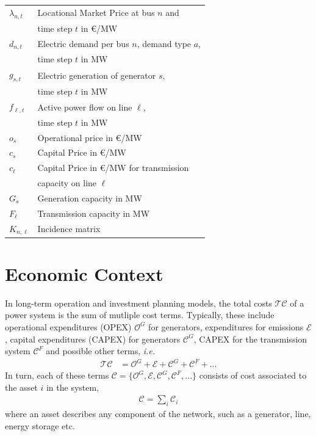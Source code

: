 \documentclass[11pt,twocolumn]{article}
\newcommand{\ie}{\textit{i.e.} }
\newcommand{\vpad}{\vspace{1mm}}
\newcommand{\generation}{g_{s,t}}
\newcommand{\capacitygeneration}{G_{s}}
\newcommand{\operationalpricegeneration}{o_{s}}
\newcommand{\capitalpricegeneration}{c_{s}}
\newcommand{\flow}{f_{\ell,t}}
\newcommand{\capacityflow}{F_{\ell}}
\newcommand{\capitalpriceflow}{c_{\ell}}
\newcommand{\lmp}[1][n]{\lambda_{#1,t}}
\newcommand{\demand}[1][n]{d_{#1,t}}
\newcommand{\incidence}[1][n]{K_{#1,\ell}}
\newcommand{\totalcost}{\mathcal{TC}}
\newcommand{\cost}{\mathcal{C}}
\newcommand{\opexgeneration}{\mathcal{O}^G}
\newcommand{\capexgeneration}{\mathcal{C}^G}
\newcommand{\capexflow}{\mathcal{C}^F}
\newcommand{\emissioncost}{\mathcal{E}}
\begin{document}
\begin{table}[h]
    \centering
    \begin{tabular}{ll}
        $\lmp$ & Locational Market Price at bus $n$ and  \\ & time step $t$ in \euro/MW \vpad \\
        $\demand$ & Electric demand per bus $n$, demand type $a$, \\ & time step $t$ in MW  \vpad \\
        $\generation$ & Electric generation of generator $s$, \\ & time step $t$  in MW \vpad \\
        $\flow$ & Active power flow on line $\ell$, \\ & time step $t$ in MW   \vpad \\
        $\operationalpricegeneration$ & Operational price in \euro/MW \vpad \\
        $\capitalpricegeneration$ & Capital Price in \euro/MW \vpad \\
        $\capitalpriceflow$  & Capital Price in \euro/MW for transmission \\ & capacity on line $\ell$  \vpad \\
        $\capacitygeneration$ & Generation capacity in MW \vpad \\
        $\capacityflow$ & Transmission capacity in MW \vpad \\
        $\incidence$ & Incidence matrix \vpad 
    \end{tabular}
\end{table}

\section{Economic Context}

In long-term operation and investment planning models, the total costs $\totalcost$ of a power system is the sum of mutliple cost terms. Typically, these include operational expenditures (OPEX) $\opexgeneration$ for generators, expenditures for emissions $\emissioncost$, capital expenditures (CAPEX) for generators $\capexgeneration$, CAPEX for the transmission system $\capexflow$ and possible other terms, \ie
\begin{align}
\totalcost &= \opexgeneration + \emissioncost +  \capexgeneration +  \capexflow + ...
\label{eq:total_cost}
\end{align}
In turn, each of these terms $\mathcal{C} = \{\opexgeneration, \emissioncost, \capexgeneration, \capexflow, ...\}$ consists of cost associated to the asset $i$ in the system, 
\begin{align}
    \cost = \sum_{i} \cost_{i}
    \label{eq:asset_cost}
\end{align} 
where an asset describes any component of the network, such as a generator, line, energy storage etc. %
\end{document}
